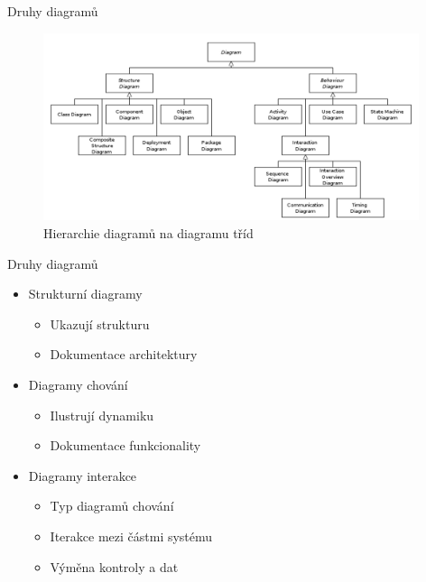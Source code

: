
\begin{frame}{Druhy diagramů}

\begin{figure}
	\includegraphics[width=110mm]{img/diagramy2.png}
	\caption{Hierarchie diagramů na diagramu tříd}
\end{figure}
	
\end{frame}


\begin{frame}{Druhy diagramů}

\begin{itemize}
	\item<+-> Strukturní diagramy
	\onslide<+->
	\begin{itemize}
		\item Ukazují strukturu
		\item Dokumentace architektury
	\end{itemize}
	
	\item<+-> Diagramy chování
	\onslide<+->
	\begin{itemize}
		\item Ilustrují dynamiku
		\item Dokumentace funkcionality
	\end{itemize}

	\item<+-> Diagramy interakce
	\onslide<+->
	\begin{itemize}
		\item Typ diagramů chování
		\item Iterakce mezi částmi systému
		\item Výměna kontroly a dat
	\end{itemize}

\end{itemize}
	
\end{frame}


